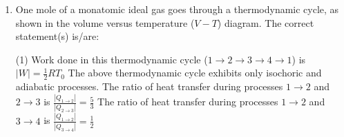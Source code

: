 
\begin{enumerate}
    \item One mole of a monatomic ideal gas goes through a thermodynamic cycle, as shown in the volume versus temperature (\(V-T\)) diagram. The correct statement(s) is/are:
        \begin{tasks}(1)
            \task Work done in this thermodynamic cycle (\(1 \rightarrow 2 \rightarrow 3 \rightarrow 4 \rightarrow 1\)) is \(|W| = \frac{1}{2}R{T_0}\)
            \task The above thermodynamic cycle exhibits only isochoric and adiabatic processes.
            \task The ratio of heat transfer during processes \(1 \rightarrow 2\) and \(2 \rightarrow 3\) is \(\frac{|Q_{1 \rightarrow 2}|}{|Q_{2 \rightarrow 3}|} = \frac{5}{3}\) 
            \task The ratio of heat transfer during processes \(1 \rightarrow 2\) and \(3 \rightarrow 4\) is \(\frac{|Q_{1 \rightarrow 2}|}{|Q_{3 \rightarrow 4}|} = \frac{1}{2}\)
        \end{tasks}
\end{enumerate}
